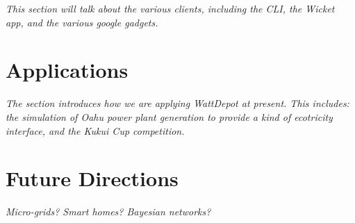 \documentclass[conference,compsoc]{IEEEtran}
\begin{document}
{\em This section will talk about the various clients, including the CLI,
  the Wicket app, and the various google gadgets.}

\section{Applications}

{\em The section introduces how we are applying WattDepot at present. This
includes: the simulation of Oahu power plant generation to provide a kind
of ecotricity interface, and the Kukui Cup competition.}

\section{Future Directions}

{\em Micro-grids? Smart homes? Bayesian networks?}



\end{document}
